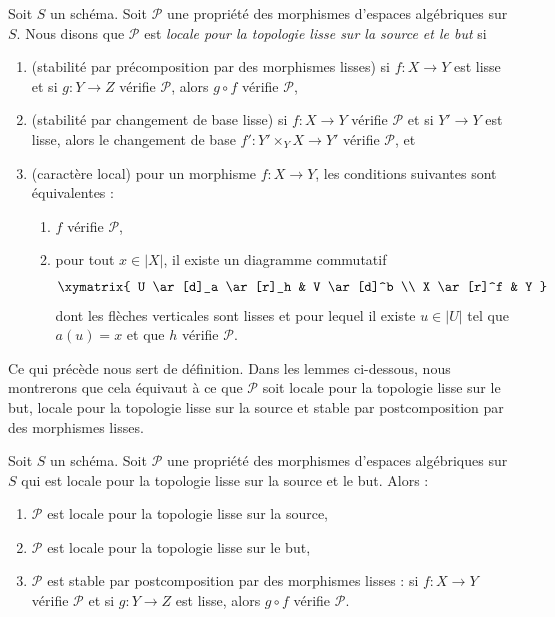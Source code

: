 \begin{definition}
\label{definition-local-source-target}
Soit $S$ un schéma.
Soit $\mathcal{P}$ une propriété des morphismes d'espaces algébriques sur $S$.
Nous disons que $\mathcal{P}$ est {\it locale pour la topologie lisse sur la source et le but} si
\begin{enumerate}
\item (stabilité par précomposition par des morphismes lisses)
si $f : X \to Y$ est lisse et si $g : Y \to Z$ vérifie $\mathcal{P}$,
alors $g \circ f$ vérifie $\mathcal{P}$,
\item (stabilité par changement de base lisse)
si $f : X \to Y$ vérifie $\mathcal{P}$ et si $Y' \to Y$ est lisse, alors
le changement de base $f' : Y' \times_Y X \to Y'$ vérifie $\mathcal{P}$, et
\item (caractère local) pour un morphisme $f : X \to Y$, les conditions suivantes sont
équivalentes :
\begin{enumerate}
\item $f$ vérifie $\mathcal{P}$,
\item pour tout $x \in |X|$, il existe un diagramme commutatif
$$
\xymatrix{
U \ar[d]_a \ar[r]_h & V \ar[d]^b \\
X \ar[r]^f & Y
}
$$
dont les flèches verticales sont lisses et pour lequel il existe $u \in |U|$ tel que $a(u) = x$ et que
$h$ vérifie $\mathcal{P}$.
\end{enumerate}
\end{enumerate}
\end{definition}

\noindent
Ce qui précède nous sert de définition. Dans les lemmes ci-dessous, nous montrerons que
cela équivaut à ce que $\mathcal{P}$ soit locale pour la topologie lisse sur le but,
locale pour la topologie lisse sur la source et stable par postcomposition par des morphismes lisses.

\begin{lemma}
\label{lemma-local-source-target-implies}
Soit $S$ un schéma.
Soit $\mathcal{P}$ une propriété des morphismes d'espaces algébriques sur $S$
qui est locale pour la topologie lisse sur la source et le but. Alors :
\begin{enumerate}
\item $\mathcal{P}$ est locale pour la topologie lisse sur la source,
\item $\mathcal{P}$ est locale pour la topologie lisse sur le but,
\item $\mathcal{P}$ est stable par postcomposition par des morphismes lisses :
si $f : X \to Y$ vérifie $\mathcal{P}$ et si $g : Y \to Z$ est lisse, alors
$g \circ f$ vérifie $\mathcal{P}$.
\end{enumerate}
\end{lemma}

